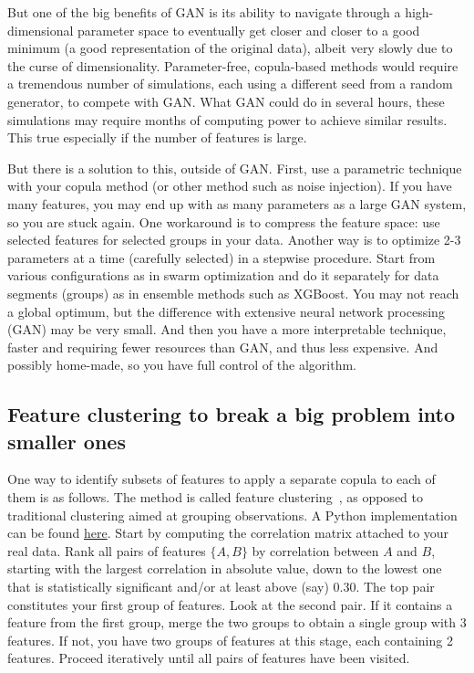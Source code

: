 \documentclass[oneside,10pt]{book}
\begin{document}
But one of the big benefits of GAN is its ability to navigate through a high-dimensional parameter space to eventually get closer and closer to a good minimum (a good representation of the original data), albeit very slowly due to the curse of dimensionality. Parameter-free, copula-based methods would require a tremendous number of simulations, each using a different seed from a random generator, to compete with GAN. What GAN could do in several hours, these simulations may require months of computing power to achieve similar results. This true especially if the number of features is large.

But there is a solution to this, outside of GAN. First, use a parametric technique with your copula method (or other method such as noise injection). If you have many features, you may end up with as many parameters as a large GAN system, so you are stuck again. One workaround is to compress the feature space: use selected features for selected groups in your data. Another way is to optimize 2-3 parameters at a time (carefully selected) in a stepwise procedure. Start from various configurations as in swarm optimization and do it separately for data segments (groups) as in ensemble methods such as XGBoost. You may not reach a global optimum, but the difference with extensive neural network processing (GAN) may be very small. And then you have a more interpretable technique, faster and requiring fewer resources than GAN, and thus less expensive. And possibly home-made, so you have full control of the algorithm.

\subsection{Feature clustering to break a big problem into smaller ones}\label{fcv34}

One way to identify subsets of features to apply a separate copula to each of them is as follows. The method
 is called \textcolor{index}{feature clustering}~\cite{fcnice}, as opposed
to traditional clustering aimed at grouping observations. A Python implementation can be found \href{https://scikit-learn.org/stable/modules/generated/sklearn.cluster.FeatureAgglomeration.html}{here}.
Start by computing the correlation matrix
 attached to your real data. Rank all pairs of features $\{A, B\}$  by correlation between $A$ and $B$, starting with the largest correlation in absolute value, down to the lowest one that is statistically significant and/or at least above (say) $0.30$.
The top pair constitutes your first group of features. Look at the second pair. If it contains a feature from the first group, merge the two groups to obtain a single group with 3 features. If not, you have two groups of features at this stage, each containing 2 features. Proceed iteratively until
all pairs of features have been visited.
\end{document}
